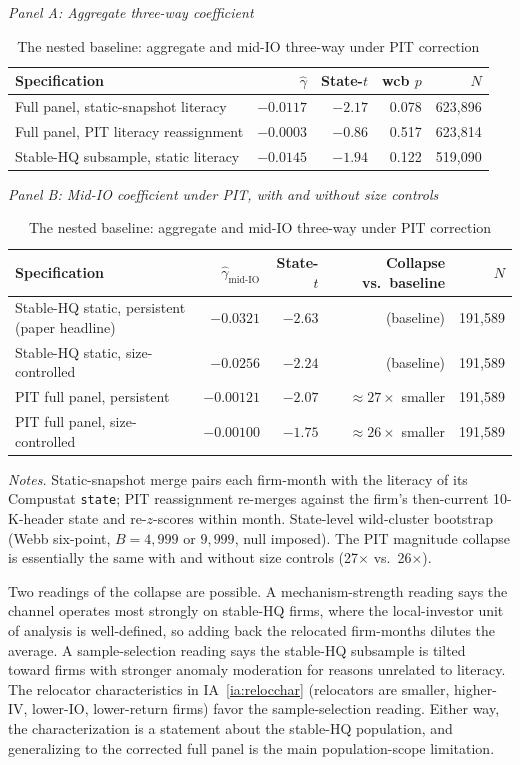 \begin{table}[t]
\centering
\caption{The nested baseline: aggregate and mid-IO three-way under PIT correction}
\label{tab:nested}
\footnotesize
\begin{minipage}{\textwidth}
\centering
\textit{Panel A: Aggregate three-way coefficient}\\[2pt]
\begin{tabular}{lrrrr}
\toprule
Specification & $\hat\gamma$ & State-$t$ & wcb $p$ & $N$ \\
\midrule
Full panel, static-snapshot literacy & $-0.0117$ & $-2.17$ & 0.078 & 623,896 \\
Full panel, PIT literacy reassignment & $-0.0003$ & $-0.86$ & 0.517 & 623,814 \\
Stable-HQ subsample, static literacy  & $-0.0145$ & $-1.94$ & 0.122 & 519,090 \\
\bottomrule
\end{tabular}

\medskip
\textit{Panel B: Mid-IO coefficient under PIT, with and without size controls}\\[2pt]
\begin{tabular}{lrrrr}
\toprule
Specification & $\hat\gamma_{\text{mid-IO}}$ & State-$t$ & Collapse vs.\ baseline & $N$ \\
\midrule
Stable-HQ static, persistent (paper headline) & $-0.0321$ & $-2.63$ & (baseline) & 191,589 \\
Stable-HQ static, size-controlled & $-0.0256$ & $-2.24$ & (baseline) & 191,589 \\
PIT full panel, persistent & $-0.00121$ & $-2.07$ & $\approx 27\times$ smaller & 191,589 \\
PIT full panel, size-controlled & $-0.00100$ & $-1.75$ & $\approx 26\times$ smaller & 191,589 \\
\bottomrule
\end{tabular}
\end{minipage}

\medskip
{\footnotesize\textit{Notes.} Static-snapshot merge pairs each firm-month with the literacy of its Compustat \texttt{state}; PIT reassignment re-merges against the firm's then-current 10-K-header state and re-$z$-scores within month. State-level wild-cluster bootstrap (Webb six-point, $B = 4{,}999$ or $9{,}999$, null imposed). The PIT magnitude collapse is essentially the same with and without size controls (27$\times$ vs.\ 26$\times$).}
\end{table}

Two readings of the collapse are possible. A mechanism-strength reading says the channel operates most strongly on stable-HQ firms, where the local-investor unit of analysis is well-defined, so adding back the relocated firm-months dilutes the average. A sample-selection reading says the stable-HQ subsample is tilted toward firms with stronger anomaly moderation for reasons unrelated to literacy. The relocator characteristics in IA~\ref{ia:relocchar} (relocators are smaller, higher-IV, lower-IO, lower-return firms) favor the sample-selection reading. Either way, the characterization is a statement about the stable-HQ population, and generalizing to the corrected full panel is the main population-scope limitation.

